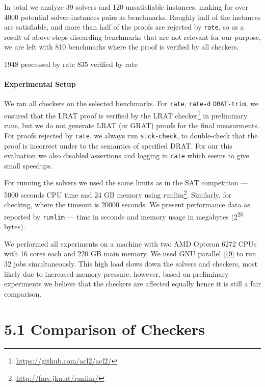 \documentclass[
]{report}
\begin{document}
In total we analyze 39 solvers and 120 unsatisfiable instances, making
for over 4000 potential solver-instances pairs as benchmarks. Roughly
half of the instances are satisfiable, and more than half of the proofs
are rejected by \texttt{rate}, so as a result of above steps discarding
benchmarks that are not relevant for our purpose, we are left with 810
benchmarks where the proof is verified by all checkers.

 1948 processed by rate 835 verified by rate \fi

\paragraph{Experimental Setup}

We ran all checkers on the selected benchmarks. For \texttt{rate},
\texttt{rate-d} \texttt{DRAT-trim}, we ensured that the LRAT proof is
verified by the LRAT checker\footnote{\url{https://github.com/acl2/acl2/}}
in preliminary runs, but we do not generate LRAT (or GRAT) proofs for
the final measurments. For proofs rejected by \texttt{rate}, we always
run \texttt{sick-check}, to double-check that the proof is incorrect
under to the semantics of specified DRAT. For our this evaluation we
also disabled assertions and logging in \texttt{rate} which seems to
give small speedups.

For running the solvers we used the same limits as in the SAT
competition --- 5000 seconds CPU time and 24 GB memory using
runlim\footnote{\url{http://fmv.jku.at/runlim/}}. Similarly, for
checking, where the timeout is 20000 seconds. We present performance
data as reported by \texttt{runlim} --- time in seconds and memory usage
in megabytes (2\textsuperscript{20} bytes).

We performed all experiments on a machine with two AMD Opteron 6272 CPUs
with 16 cores each and 220 GB main memory. We used GNU parallel
{[}\protect\hyperlink{ref-Tange2018}{19}{]} to run 32 jobs
simultaneously. This high load slows down the solvers and checkers, most
likely due to increased memory pressure, however, based on preliminary
experiments we believe that the checkers are affected equally hence it
is still a fair comparison.

\hypertarget{comparison-of-checkers}{%
\section{5.1 Comparison of Checkers}\label{comparison-of-checkers}}
\end{document}
